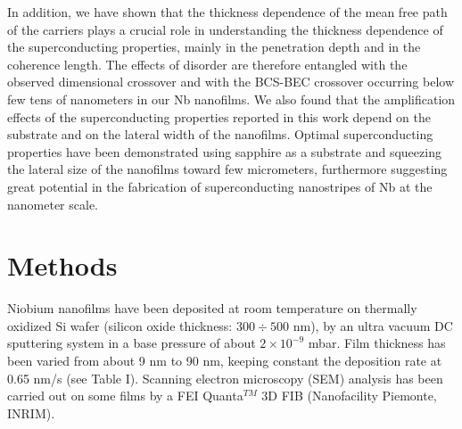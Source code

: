 \documentclass[reprint,onecolumn,superscriptaddress,a4paper,nofootinbib,floatfix]{revtex4-1}
\begin{document}
In addition, we have shown that the thickness dependence of the mean free path of the carriers plays a crucial role in understanding the thickness dependence of the superconducting properties, mainly in the penetration depth and in the coherence length. The effects of disorder are therefore entangled with the observed dimensional crossover and with the BCS-BEC crossover occurring below few tens of nanometers in our Nb nanofilms.
We also found that the amplification effects of the superconducting properties reported in this work depend on the substrate and on the lateral width of the nanofilms. Optimal superconducting properties have been demonstrated using sapphire as a substrate and squeezing the lateral size of the nanofilms toward few micrometers, furthermore suggesting great potential in the fabrication of superconducting nanostripes of Nb at the nanometer scale.

\section*{Methods}

Niobium nanofilms have been deposited at room temperature on thermally oxidized Si wafer (silicon oxide thickness: $300\div500$ nm), by an ultra vacuum DC sputtering system in a base pressure of about $2\times 10^{-9}$ mbar. Film thickness has been varied from about 9 nm to 90 nm, keeping constant the deposition rate at 0.65 nm/s (see Table I). Scanning electron microscopy (SEM) analysis has been carried out on some films by a FEI Quanta$^{TM}$ 3D FIB (Nanofacility Piemonte, INRIM).
\end{document}
